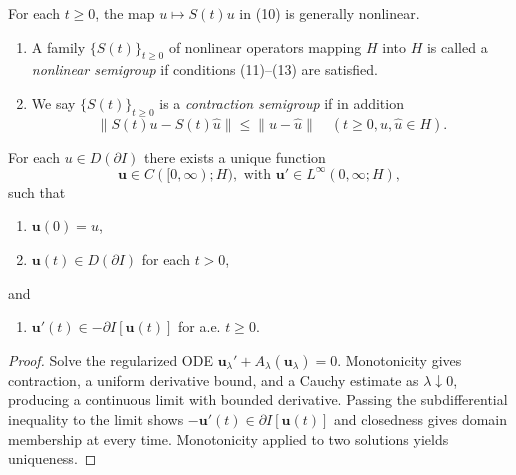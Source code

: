 \begin{remark}
\label{rem:nonlinear-semigroup-notation}
For each $t\geq0$, the map $u\mapsto S(t)u$ in (10) is generally nonlinear.
\end{remark}

\begin{definition}
\label{def:nonlinear-contraction-semigroup}
\begin{enumerate}
\item[(i)] A family $\{S(t)\}_{t \geq 0}$ of nonlinear operators mapping $H$ into $H$ is called a \textit{nonlinear semigroup} if conditions (11)--(13) are satisfied.
\item[(ii)] We say $\{S(t)\}_{t \geq 0}$ is a \textit{contraction semigroup} if in addition
\[
\|S(t)u - S(t)\hat{u}\| \leq \|u - \hat{u}\| \quad (t \geq 0, u, \hat{u} \in H).
\tag{14}
\]
\end{enumerate}
\end{definition}

\begin{theorem}
\label{thm:solution-of-gradient-flow}

For each $u \in D(\partial I)$ there exists a unique function
\[
\mathbf{u} \in C([0, \infty); H), \text{ with } \mathbf{u}' \in L^\infty(0, \infty; H),
\tag{16}
\]
such that
\begin{enumerate}
\item[(i)] $\mathbf{u}(0) = u$,
\item[(ii)] $\mathbf{u}(t) \in D(\partial I)$ for each $t > 0$,
\end{enumerate}
and
\begin{enumerate}
\item[(iii)] $\mathbf{u}'(t) \in -\partial I[\mathbf{u}(t)]$ for a.e. $t \geq 0$.
\end{enumerate}
\end{theorem}

\begin{proof}
\sketch Solve the regularized ODE $\mathbf u_\lambda'+A_\lambda(\mathbf u_\lambda)=0$. Monotonicity gives contraction, a uniform derivative bound, and a Cauchy estimate as $\lambda\downarrow0$, producing a continuous limit with bounded derivative. Passing the subdifferential inequality to the limit shows $-\mathbf u'(t)\in\partial I[\mathbf u(t)]$ and closedness gives domain membership at every time. Monotonicity applied to two solutions yields uniqueness.
\end{proof}

